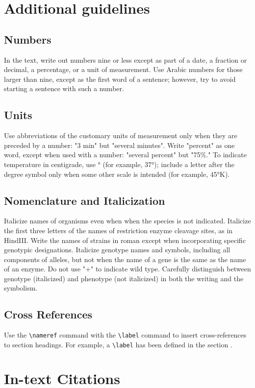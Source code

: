 \documentclass[9pt,twocolumn,twoside]{gsag3jnl}
\begin{document}
\section{Additional guidelines}

\subsection{Numbers} In the text, write out numbers nine or less except as part of a date, a fraction or decimal, a percentage, or a unit of measurement. Use Arabic numbers for those larger than nine, except as the first word of a sentence; however, try to avoid starting a sentence with such a number.

\subsection{Units} Use abbreviations of the customary units of measurement only when they are preceded by a number: "3 min" but "several minutes". Write "percent" as one word, except when used with a number: "several percent" but "75\%." To indicate temperature in centigrade, use ° (for example, 37°); include a letter after the degree symbol only when some other scale is intended (for example, 45°K).

\subsection{Nomenclature and Italicization} Italicize names of organisms even when  when the species is not indicated.  Italicize the first three letters of the names of restriction enzyme cleavage sites, as in HindIII. Write the names of strains in roman except when incorporating specific genotypic designations. Italicize genotype names and symbols, including all components of alleles, but not when the name of a gene is the same as the name of an enzyme. Do not use "+" to indicate wild type. Carefully distinguish between genotype (italicized) and phenotype (not italicized) in both the writing and the symbolism.

\subsection{Cross References}
Use the \verb|\nameref| command with the \verb|\label| command to insert cross-references to section headings. For example, a \verb|\label| has been defined in the section .

\section{In-text Citations}
\end{document}
